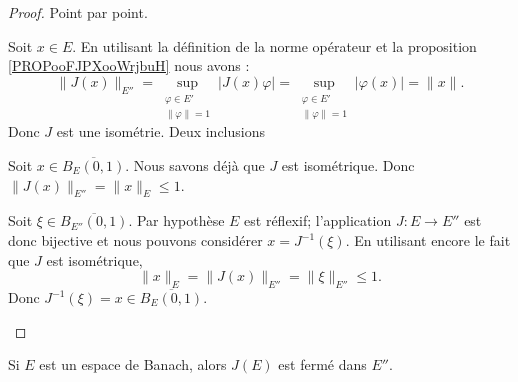 \begin{proof}
	Point par point.
	\begin{subproof}
		\spitem[Isométrie]
		Soit \( x\in E\). En utilisant la définition de la norme opérateur et la proposition \ref{PROPooFJPXooWrjbuH} nous avons :
		\begin{equation}
			\| J(x) \|_{E''}=\sup_{\substack{ \varphi\in E' \\ \| \varphi \|=1 }} | J(x)\varphi |= \sup_{\substack{ \varphi\in E' \\ \| \varphi \|=1 }} | \varphi(x) |=\| x \|.
		\end{equation}
		Donc \( J\) est une isométrie.
		Deux inclusions
		\begin{subproof}
			Soit \( x\in \overline{B_E(0,1)}\). Nous savons déjà que \( J\) est isométrique. Donc \( \| J(x) \|_{E''}=\| x \|_E\leq 1\).

			Soit \( \xi\in \overline{B_{E''}(0,1)}\). Par hypothèse \( E\) est réflexif; l'application \(J \colon E\to E''  \) est donc bijective et nous pouvons considérer \( x=J^{-1}(\xi)\). En utilisant encore le fait que \( J\) est isométrique,
			\begin{equation}
				\| x \|_E=\| J(x) \|_{E''}=\| \xi \|_{E''}\leq 1.
			\end{equation}
			Donc \( J^{-1}(\xi)=x\in \overline{B_E(0,1)}\).
		\end{subproof}
	\end{subproof}
\end{proof}

\begin{proposition}	\label{PROPooHOKQooDWpTqM}
	Si \( E\) est un espace de Banach, alors \( J(E)\) est fermé dans \( E''\).
\end{proposition}

